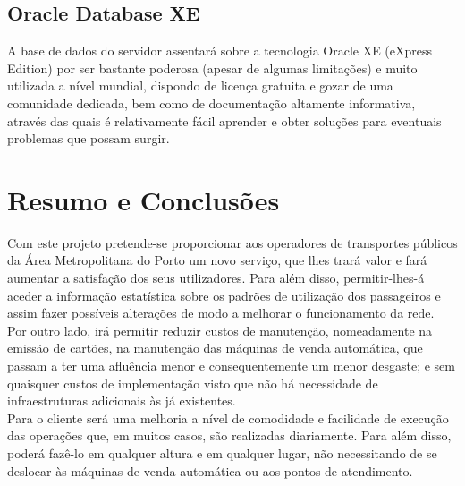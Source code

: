 \subsection{Oracle Database XE}

A base de dados do servidor assentará sobre a tecnologia Oracle XE (eXpress Edition) por ser bastante poderosa (apesar de algumas limitações) e muito utilizada a nível mundial, dispondo de licença gratuita e gozar de uma comunidade dedicada, bem como de documentação altamente informativa, através das quais é relativamente fácil aprender e obter soluções para eventuais problemas que possam surgir.

\section{Resumo e Conclusões}

Com este projeto pretende-se proporcionar aos operadores de transportes públicos da Área Metropolitana do Porto um novo serviço, que lhes trará valor e fará aumentar a satisfação dos seus utilizadores. Para além disso, permitir-lhes-á aceder a informação estatística sobre os padrões de utilização dos passageiros e assim fazer possíveis alterações de modo a melhorar o funcionamento da rede.
\\Por outro lado, irá permitir reduzir custos de manutenção, nomeadamente na emissão de cartões, na manutenção das máquinas de venda automática, que passam a ter uma afluência menor e consequentemente um menor desgaste; e sem quaisquer custos de implementação visto que não há necessidade de infraestruturas adicionais às já existentes.
\\Para o cliente será uma melhoria a nível de comodidade e facilidade de execução das operações que, em muitos casos, são realizadas diariamente. Para além disso, poderá fazê-lo em qualquer altura e em qualquer lugar, não necessitando de se deslocar às máquinas de venda automática ou aos pontos de atendimento. 

